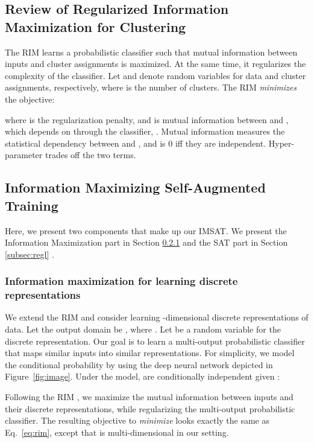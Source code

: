 \documentclass{article}
\theoremstyle{plain}
\begin{document}
\subsection{Review of Regularized Information Maximization for Clustering} \label{subsec:rim}
The RIM \citep{krause2010discriminative} learns a probabilistic classifier  such that mutual information \citep{cover2012elements} between inputs and cluster assignments is maximized. At the same time, it regularizes the complexity of the classifier.
Let  and  denote random variables for data and cluster assignments, respectively, where  is the number of clusters.
The RIM \emph{minimizes} the objective:

where  is the regularization penalty, and  is mutual information between  and , which depends on  through the classifier, .
Mutual information measures the statistical dependency between  and , and is 0 iff they are independent. Hyper-parameter  trades off the two terms.

\subsection{Information Maximizing Self-Augmented Training} \label{subsec:imsat}
Here, we present two components that make up our IMSAT. We present the Information Maximization part in Section \ref{subsec:framework} and the SAT part in Section \ref{subsec:regl} .
\subsubsection{Information maximization for learning discrete representations} \label{subsec:framework}
We extend the RIM and consider learning -dimensional discrete representations of data. Let the output domain be , where . Let  be a random variable for the discrete representation. 
Our goal is to learn a multi-output probabilistic classifier  that maps similar inputs into similar representations.
For simplicity, we model the conditional probability  by using the deep neural network depicted in Figure~\ref{fig:image}. Under the model,  are conditionally independent given : 



Following the RIM \citep{krause2010discriminative}, we maximize the mutual information between inputs and their discrete representations, while regularizing the multi-output probabilistic classifier.
The resulting objective to \emph{minimize} looks exactly the same as Eq.~\eqref{eq:rim}, except that  is multi-dimensional in our setting.
 
\end{document}
